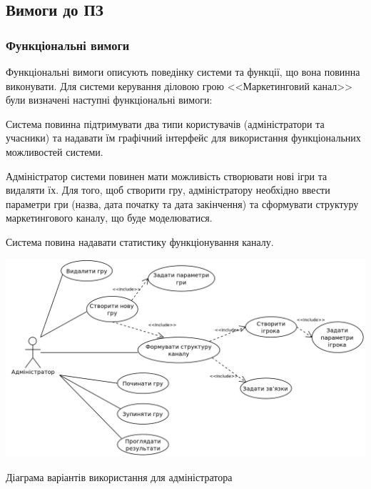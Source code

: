     \subsection{Вимоги до ПЗ}
        \subsubsection{Функціональні вимоги}
Функціональні вимоги описують поведінку системи та функції, що вона повинна виконувати. Для системи керування діловою грою <<Маркетинговий канал>> були визначені наступні функціональні вимоги:
            \begin{longEnumerate}
\item Система повинна підтримувати два типи користувачів (адміністратори та учасники) та надавати їм графічний інтерфейс для використання функціональних можливостей системи.
\item Адміністратор системи повинен мати можливість створювати нові ігри та видаляти їх. Для того, щоб створити гру, адміністратору необхідно ввести параметри гри (назва, дата початку та дата закінчення) та сформувати структуру маркетингового каналу, що буде моделюватися. 
\item Система повина надавати статистику функціонування каналу.

            \begin{stdfigure}
                \includegraphics[width=7in]{images/uml_uc_admin.png}
                \caption{Діаграма варіантів використання для адміністратора}
                \label{fig:uml_uc_admin}
            \end{stdfigure}


\end{longEnumerate}
